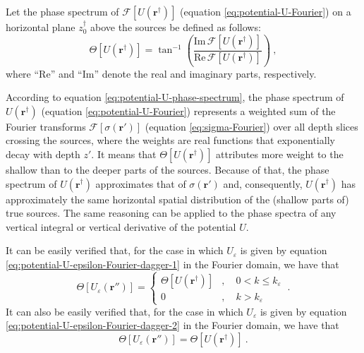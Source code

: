 \label{app:potential-U-min-phase}

Let the phase spectrum \cite[e.g.,][ p. 261]{blakely1996} of  
$\mathcal{F} [ U(\mathbf{r}^{\dagger}) ]$ (equation \ref{eq:potential-U-Fourier}) 
on a horizontal plane $z^{\dagger}_{0}$ above the sources be defined as follows:
\begin{equation}
	\Theta [ U(\mathbf{r}^{\dagger}) ] = \tan^{-1} \left( 
	\frac{\text{Im} \, \mathcal{F} [ U(\mathbf{r}^{\dagger}) ]}{\text{Re} \, \mathcal{F} [ U(\mathbf{r}^{\dagger}) ]} 
	\right) \: ,
	\label{eq:potential-U-phase-spectrum}
\end{equation}
where ``$\text{Re}$'' and ``$\text{Im}$'' denote the real and imaginary parts, respectively.

According to equation \ref{eq:potential-U-phase-spectrum}, the phase spectrum of $U(\mathbf{r}^{\dagger})$ (equation \ref{eq:potential-U-Fourier}) 
represents a weighted sum of the Fourier transforms $\mathcal{F} [ \sigma(\mathbf{r}') ]$
(equation \ref{eq:sigma-Fourier}) over all depth slices crossing the sources,
where the weights are real functions that exponentially decay with depth $z'$.
It means that $\Theta [ U(\mathbf{r}^{\dagger}) ]$ attributes more weight to the shallow than to the deeper parts of the sources. 
Because of that, the phase spectrum of $U(\mathbf{r}^{\dagger})$ approximates that of $\sigma(\mathbf{r}')$ and, consequently, 
$U(\mathbf{r}^{\dagger})$ has approximately the same horizontal spatial distribution of the (shallow parts of) true sources.
The same reasoning can be applied to the phase spectra of any vertical integral or vertical derivative of the potential $U$.

It can be easily verified that, for the case in which $U_{\varepsilon}$ is given by equation 
\ref{eq:potential-U-epsilon-Fourier-dagger-1} in the Fourier domain, we have that
\begin{equation}
	\Theta [ U_{\varepsilon}(\mathbf{r}'') ] = \begin{cases}
		\Theta [ U(\mathbf{r}^{\dagger}) ] & , \quad 0 < k \le k_{\varepsilon} \\
		0 & , \quad k > k_{\varepsilon}
	\end{cases} \: .
	\label{eq:potential-U-epsilon-1-phase-spectrum}
\end{equation}
It can also be easily verified that, for the case in which $U_{\varepsilon}$ is given by equation 
\ref{eq:potential-U-epsilon-Fourier-dagger-2} in the Fourier domain, we have that
\begin{equation}
	\Theta [ U_{\varepsilon}(\mathbf{r}'') ] = \Theta [ U(\mathbf{r}^{\dagger}) ] \: .
	\label{eq:potential-U-epsilon-2-phase-spectrum}
\end{equation}